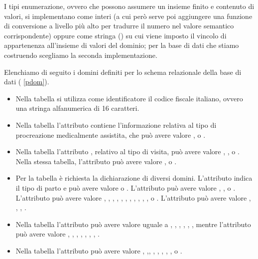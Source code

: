 I tipi enumerazione, ovvero che possono assumere un insieme finito e contenuto di valori, si implementano come interi (a cui però serve poi aggiungere una funzione di conversione a livello più alto per tradurre il numero nel valore semantico corrispondente) oppure come stringa () su cui viene imposto il vincolo di appartenenza all'insieme di valori del dominio; per la base di dati che stiamo costruendo scegliamo la seconda implementazione.

Elenchiamo di seguito i domini definiti per lo schema relazionale della base di dati (\lstlistingname{} \ref{pdom}).

\begin{itemize}
\item Nella tabella  si utilizza come identificatore il codice fiscale italiano, ovvero una stringa alfanumerica di 16 caratteri.
\item Nella tabella  l'attributo  contiene l'informazione relativa al tipo di procreazione medicalmente assistita, che può avere valore ,  o .
\item Nella tabella  l'attributo , relativo al tipo di visita, può avere valore , ,  o . Nella stessa tabella, l'attributo  può avere valore ,  o .
\item Per la tabella  è richiesta la dichiarazione di diversi domini. L'attributo  indica il tipo di parto e può avere valore  o . L'attributo  può avere valore , ,  o . L'attributo  può avere valore , , , , , , , , , , ,  o . L'attributo  può avere valore , , , .
\item Nella tabella  l'attributo  può avere valore uguale a , , , , , , mentre l'attributo  può avere valore , , , , , , , .
\item Nella tabella  l'attributo  può avere valore , ,\linebreak {}, , , , , ,  o .
\end{itemize}

